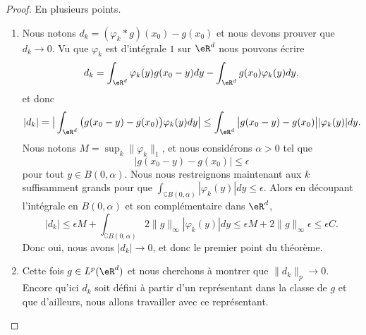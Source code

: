 \begin{proof}
    En plusieurs points.
    \begin{enumerate}
        \item
            Nous notons \( d_k=(\varphi_k*g)(x_0)-g(x_0)\) et nous devons prouver que \( d_k\to 0\). Vu que \( \varphi_k\) est d'intégrale \( 1\) sur \( \eR^d\) nous pouvons écrire
            \begin{equation}
                d_k=\int_{\eR^d}\varphi_k(y)g(x_0-y)dy-\int_{\eR^d}g(x_0)\varphi_k(y)dy,
            \end{equation}
            et donc
            \begin{equation}
                |d_k|=\big| \int_{\eR^d}\big( g(x_0-y)-g(x_0) \big)\varphi_k(y)dy\big|\leq\int_{\eR^d}\big| g(x_0-y)-g(x_0) \big| |\varphi_k(y) |dy.
            \end{equation}
            Nous notons \( M=\sup_k\| \varphi_k \|_1\), et nous considérons \( \alpha>0\) tel que
            \begin{equation}
                \big| g(x_0-y)-g(x_0) \big|\leq \epsilon
            \end{equation}
            pour tout \( y\in B(0,\alpha)\). Nous nous restreignons maintenant aux \( k\) suffisamment grands pour que \( \int_{\complement B(0,\alpha)}| \varphi_k(y) |dy\leq \epsilon\). Alors en découpant l'intégrale en \( B(0,\alpha)\) et son complémentaire dans \( \eR^d\),
            \begin{equation}
                | d_k |\leq \epsilon M+\int_{\complement B(0,\alpha)} 2\| g \|_{\infty}| \varphi_k(y) |dy  \leq \epsilon M+2\| g \|_{\infty}\epsilon\leq \epsilon C.
            \end{equation}
            Donc oui, nous avons \( | d_k |\to 0\), et donc le premier point du théorème.

        \item

            Cette fois \( g\in L^p(\eR^d)\) et nous cherchons à montrer que \( \| d_k \|_p\to 0\). Encore qu'ici \( d_k\) soit défini à partir d'un représentant dans la classe de \( g\) et que d'ailleurs, nous allons travailler avec ce représentant.


\end{enumerate}
\end{proof}
